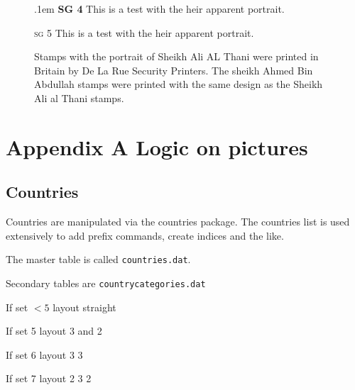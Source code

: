 \documentclass[justified]{tufte-book}
\begin{document}
\begin{figure}[hp]
\parbox[t]{3.3cm}{\small\hangindent.1em \textsc{\textbf{SG 4}}  This is a test with the heir apparent portrait.} \parbox[t]{3.3cm}{\textsc{sg 5} \small This is a test with the heir apparent portrait.}

\caption{Stamps with the portrait of Sheikh Ali AL Thani were printed in Britain by De La Rue Security Printers. The sheikh Ahmed Bin Abdullah stamps were printed with the same design as the Sheikh Ali al Thani stamps.}
\end{figure}
\lipsum[2]

\chapter{Appendix A Logic on pictures}
\section{Countries}
Countries are manipulated via the countries package.
The countries list is used extensively to add prefix commands, create indices and the like.

The master table is called \texttt{countries.dat}.

Secondary tables are \texttt{countrycategories.dat}


If set $<5$ layout straight

If set 5  layout 3 and 2

If set 6 layout 3 3

If set 7 layout 2 3 2

\end{document}
